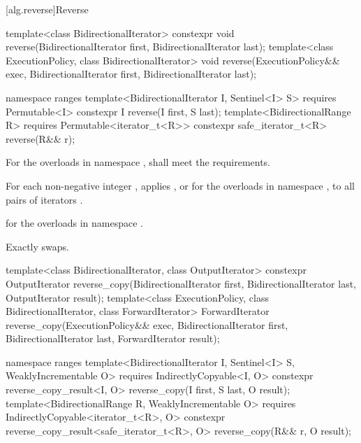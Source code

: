 [alg.reverse]{Reverse}

%
\begin{itemdecl}
template<class BidirectionalIterator>
  constexpr void reverse(BidirectionalIterator first, BidirectionalIterator last);
template<class ExecutionPolicy, class BidirectionalIterator>
  void reverse(ExecutionPolicy&& exec,
               BidirectionalIterator first, BidirectionalIterator last);

namespace ranges {
  template<BidirectionalIterator I, Sentinel<I> S>
    requires Permutable<I>
    constexpr I reverse(I first, S last);
  template<BidirectionalRange R>
    requires Permutable<iterator_t<R>>
    constexpr safe_iterator_t<R> reverse(R&& r);
}
\end{itemdecl}

\begin{itemdescr}
\pnum
\requires
For the overloads in namespace ,
 shall meet
the  requirements.

\pnum
\effects
For each non-negative integer ,
applies , or
 for the overloads in namespace ,
to all pairs of iterators .

\pnum
\returns
{} for the overloads in namespace .

\pnum
\complexity
Exactly  swaps.
\end{itemdescr}

%
\begin{itemdecl}
template<class BidirectionalIterator, class OutputIterator>
  constexpr OutputIterator
    reverse_copy(BidirectionalIterator first, BidirectionalIterator last,
                 OutputIterator result);
template<class ExecutionPolicy, class BidirectionalIterator, class ForwardIterator>
  ForwardIterator
    reverse_copy(ExecutionPolicy&& exec,
                 BidirectionalIterator first, BidirectionalIterator last,
                 ForwardIterator result);

namespace ranges {
  template<BidirectionalIterator I, Sentinel<I> S, WeaklyIncrementable O>
    requires IndirectlyCopyable<I, O>
    constexpr reverse_copy_result<I, O>
      reverse_copy(I first, S last, O result);
  template<BidirectionalRange R, WeaklyIncrementable O>
    requires IndirectlyCopyable<iterator_t<R>, O>
    constexpr reverse_copy_result<safe_iterator_t<R>, O>
      reverse_copy(R&& r, O result);
}
\end{itemdecl}

